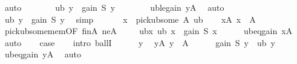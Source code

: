 \begin{isabellebody}
\ auto\isanewline
\ \ \ \ \isamarkupfalse%
\ \isamarkupfalse%
\ {\isachardoublequoteopen}ub\ y\ {\isasymle}\ gain\ S\ y{\isachardoublequoteclose}\isanewline
\ \ \ \ \ \ \isamarkupfalse%
\ ub{\isacharunderscore}{\kern0pt}le{\isacharunderscore}{\kern0pt}gain\ yA\ \isamarkupfalse%
\ auto\isanewline
\ \ \ \ \isamarkupfalse%
\ \isamarkupfalse%
\ {\isachardoublequoteopen}ub\ y\ {\isacharequal}{\kern0pt}\ gain\ S\ y{\isachardoublequoteclose}\ \isamarkupfalse%
\ simp\isanewline
\ \ \isamarkupfalse%
\isanewline
\isanewline
\ \ \isamarkupfalse%
\ {\isacharquery}{\kern0pt}x\ {\isacharequal}{\kern0pt}\ {\isachardoublequoteopen}pick{\isacharunderscore}{\kern0pt}ub{\isacharunderscore}{\kern0pt}some\ A\ ub{\isachardoublequoteclose}\isanewline
\ \ \isamarkupfalse%
\ xA{\isacharcolon}{\kern0pt}\ {\isachardoublequoteopen}{\isacharquery}{\kern0pt}x\ {\isasymin}\ A{\isachardoublequoteclose}\ \isamarkupfalse%
\ pick{\isacharunderscore}{\kern0pt}ub{\isacharunderscore}{\kern0pt}some{\isacharunderscore}{\kern0pt}mem{\isacharbrackleft}{\kern0pt}OF\ finA\ neA{\isacharbrackright}{\kern0pt}\ \isakeywordONE{{\isachardot}{\kern0pt}}\isamarkupfalse%
\isanewline
\ \ \isamarkupfalse%
\ ubx{\isacharcolon}{\kern0pt}\ {\isachardoublequoteopen}ub\ {\isacharquery}{\kern0pt}x\ {\isacharequal}{\kern0pt}\ gain\ S\ {\isacharquery}{\kern0pt}x{\isachardoublequoteclose}\isanewline
\ \ \ \ \isamarkupfalse%
\ ub{\isacharunderscore}{\kern0pt}eq{\isacharunderscore}{\kern0pt}gain\ xA\ \isamarkupfalse%
\ auto\isanewline
\isanewline
\ \ \isamarkupfalse%
\ {\isacharquery}{\kern0pt}case\isanewline
\ \ \isamarkupfalse%
\ {\isacharparenleft}{\kern0pt}intro\ ballI{\isacharparenright}{\kern0pt}\isanewline
\ \ \ \ \isamarkupfalse%
\ y\ \isamarkupfalse%
\ yA{\isacharcolon}{\kern0pt}\ {\isachardoublequoteopen}y\ {\isasymin}\ A{\isachardoublequoteclose}\isanewline
\ \ \ \ \isamarkupfalse%
\ {\isachardoublequoteopen}gain\ S\ y\ {\isacharequal}{\kern0pt}\ ub\ y{\isachardoublequoteclose}\ \isamarkupfalse%
\ ub{\isacharunderscore}{\kern0pt}eq{\isacharunderscore}{\kern0pt}gain\ yA\ \isamarkupfalse%
\ auto\isanewline
\ \ \ \ \isamarkupfalse%
\ \isamarkupfalse%

\end{isabellebody}
